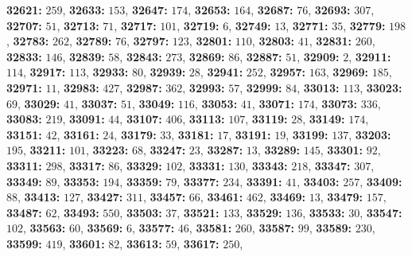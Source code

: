 \textsf{\bfseries 32621:} $259$, \textsf{\bfseries 32633:} $153$, \textsf{\bfseries 32647:} $174$, \textsf{\bfseries 32653:} $164$, \textsf{\bfseries 32687:} $76$, \textsf{\bfseries 32693:} $307$, \textsf{\bfseries 32707:} $51$, \textsf{\bfseries 32713:} $71$, \textsf{\bfseries 32717:} $101$, \textsf{\bfseries 32719:} $6$, \textsf{\bfseries 32749:} $13$, \textsf{\bfseries 32771:} $35$, \textsf{\bfseries 32779:} $198$, \textsf{\bfseries 32783:} $262$, \textsf{\bfseries 32789:} $76$, \textsf{\bfseries 32797:} $123$, \textsf{\bfseries 32801:} $110$, \textsf{\bfseries 32803:} $41$, \textsf{\bfseries 32831:} $260$, \textsf{\bfseries 32833:} $146$, \textsf{\bfseries 32839:} $58$, \textsf{\bfseries 32843:} $273$, \textsf{\bfseries 32869:} $86$, \textsf{\bfseries 32887:} $51$, \textsf{\bfseries 32909:} $2$, \textsf{\bfseries 32911:} $114$, \textsf{\bfseries 32917:} $113$, \textsf{\bfseries 32933:} $80$, \textsf{\bfseries 32939:} $28$, \textsf{\bfseries 32941:} $252$, \textsf{\bfseries 32957:} $163$, \textsf{\bfseries 32969:} $185$, \textsf{\bfseries 32971:} $11$, \textsf{\bfseries 32983:} $427$, \textsf{\bfseries 32987:} $362$, \textsf{\bfseries 32993:} $57$, \textsf{\bfseries 32999:} $84$, \textsf{\bfseries 33013:} $113$, \textsf{\bfseries 33023:} $69$, \textsf{\bfseries 33029:} $41$, \textsf{\bfseries 33037:} $51$, \textsf{\bfseries 33049:} $116$, \textsf{\bfseries 33053:} $41$, \textsf{\bfseries 33071:} $174$, \textsf{\bfseries 33073:} $336$, \textsf{\bfseries 33083:} $219$, \textsf{\bfseries 33091:} $44$, \textsf{\bfseries 33107:} $406$, \textsf{\bfseries 33113:} $107$, \textsf{\bfseries 33119:} $28$, \textsf{\bfseries 33149:} $174$, \textsf{\bfseries 33151:} $42$, \textsf{\bfseries 33161:} $24$, \textsf{\bfseries 33179:} $33$, \textsf{\bfseries 33181:} $17$, \textsf{\bfseries 33191:} $19$, \textsf{\bfseries 33199:} $137$, \textsf{\bfseries 33203:} $195$, \textsf{\bfseries 33211:} $101$, \textsf{\bfseries 33223:} $68$, \textsf{\bfseries 33247:} $23$, \textsf{\bfseries 33287:} $13$, \textsf{\bfseries 33289:} $145$, \textsf{\bfseries 33301:} $92$, \textsf{\bfseries 33311:} $298$, \textsf{\bfseries 33317:} $86$, \textsf{\bfseries 33329:} $102$, \textsf{\bfseries 33331:} $130$, \textsf{\bfseries 33343:} $218$, \textsf{\bfseries 33347:} $307$, \textsf{\bfseries 33349:} $89$, \textsf{\bfseries 33353:} $194$, \textsf{\bfseries 33359:} $79$, \textsf{\bfseries 33377:} $234$, \textsf{\bfseries 33391:} $41$, \textsf{\bfseries 33403:} $257$, \textsf{\bfseries 33409:} $88$, \textsf{\bfseries 33413:} $127$, \textsf{\bfseries 33427:} $311$, \textsf{\bfseries 33457:} $66$, \textsf{\bfseries 33461:} $462$, \textsf{\bfseries 33469:} $13$, \textsf{\bfseries 33479:} $157$, \textsf{\bfseries 33487:} $62$, \textsf{\bfseries 33493:} $550$, \textsf{\bfseries 33503:} $37$, \textsf{\bfseries 33521:} $133$, \textsf{\bfseries 33529:} $136$, \textsf{\bfseries 33533:} $30$, \textsf{\bfseries 33547:} $102$, \textsf{\bfseries 33563:} $60$, \textsf{\bfseries 33569:} $6$, \textsf{\bfseries 33577:} $46$, \textsf{\bfseries 33581:} $260$, \textsf{\bfseries 33587:} $99$, \textsf{\bfseries 33589:} $230$, \textsf{\bfseries 33599:} $419$, \textsf{\bfseries 33601:} $82$, \textsf{\bfseries 33613:} $59$, \textsf{\bfseries 33617:} $250$, 
